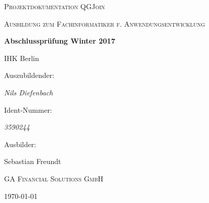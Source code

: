 \documentclass[fontsize=11pt,paper=a4,draft=off,titlepage=off, oneside]{scrartcl}
\begin{document}
\pagestyle{fancy}


\begin{titlepage}
    \centering
    {\scshape\LARGE Projektdokumentation QGJoin\par}
    \vspace{1cm}
    {\scshape\Large Ausbildung zum Fachinformatiker f. Anwendungsentwicklung\par}
    \vspace{1.5cm}
    {\huge\bfseries Abschlussprüfung Winter 2017\par IHK Berlin\par}
    \vspace{2cm}
    Auszubildender:\par
    {\Large\itshape Nils Diefenbach\par}
    Ident-Nummer:\par
    {\Large\itshape 3590244\par}
    \vfill
    Ausbilder:\par
    Sebastian Freundt\par \textsc{GA Financial Solutions GmbH}
    \vfill
    {\large \today\par}
\end{titlepage}
\clearpage
{}
\tableofcontents{}
\clearpage

\thispagestyle{empty}
\listoffigures
\listoftables
\newpage


\label{section:abbreviations}

\clearpage
{}
\label{section:einleitung}

\clearpage

























\end{document}
